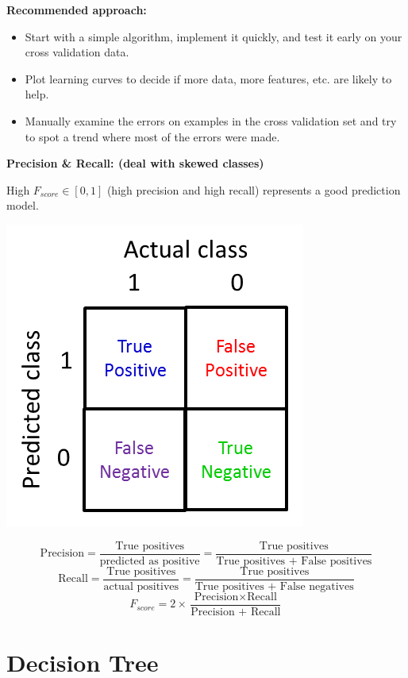\documentclass{article}
\begin{document}
\noindent \textbf{Recommended approach:}

\begin{itemize}
\item Start with a simple algorithm, implement it quickly, and test it early on your cross validation data.
\item Plot learning curves to decide if more data, more features, etc. are likely to help.
\item Manually examine the errors on examples in the cross validation set and try to spot a trend where most of the errors were made.
\end{itemize}

\noindent \textbf{Precision \& Recall: (deal with skewed classes)}

\noindent High \(F_{score} \in [0, 1]\) (high precision and high recall) represents a good prediction model.

\begin{center}
\includegraphics[scale=0.6]{./images/precision_recall.png}
\end{center}

\[\text{Precision} = \frac{\text{True positives}}{\text{predicted as positive}} = \frac{\text{True positives}}{\text{True positives + False positives}}\]
\[\text{Recall} = \frac{\text{True positives}}{\text{actual positives}} = \frac{\text{True positives}}{\text{True positives + False negatives}}\]
\[F_{score} = 2 \times \frac{\text{Precision} \times \text{Recall}}{\text{Precision + Recall}}\]

\section{Decision Tree}
\end{document}
